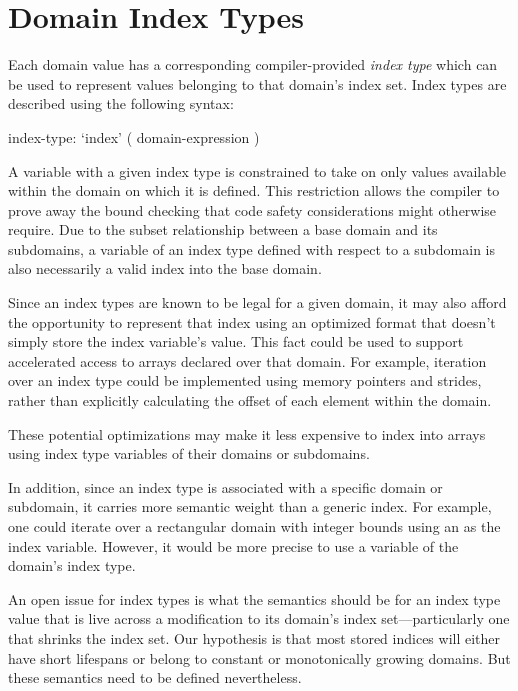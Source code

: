 \section{Domain Index Types}
\label{Index_Types}

Each domain value has a corresponding compiler-provided \emph{index
type} which can be used to represent values belonging to that domain's
index set.  Index types are described using the following syntax:

\begin{syntax}
index-type:
  `index' ( domain-expression )
\end{syntax}

A variable with a given index type is constrained to take on only values
available within the domain on which it is defined.  This restriction allows the
compiler to prove away the bound checking that code safety considerations might
otherwise require.  Due to the subset relationship between a base domain and its
subdomains, a variable of an index type defined with respect to a subdomain is
also necessarily a valid index into the base domain.

Since an index types are known to be legal for a given domain, it may
also afford the opportunity to represent that index using an optimized
format that doesn't simply store the index variable's value.  This fact could be
used to support accelerated access to arrays declared over that domain.  For
example, iteration over an index type could be implemented using memory pointers
and strides, rather than explicitly calculating the offset of each element
within the domain.

These potential optimizations may make it less expensive to
index into arrays using index type variables of their domains or
subdomains.

In addition, since an index type is associated with a specific domain or subdomain, it
carries more semantic weight than a generic index.  For example, one could
iterate over a rectangular domain with integer bounds using an  as
the index variable.  However, it would be more precise to use a variable of the
domain's index type.

\begin{openissue}

An open issue for index types is what the semantics should be for an
index type value that is live across a modification to its domain's
index set---particularly one that shrinks the index set.  Our
hypothesis is that most stored indices will either have short
lifespans or belong to constant or monotonically growing domains.  But
these semantics need to be defined nevertheless.

\end{openissue}

